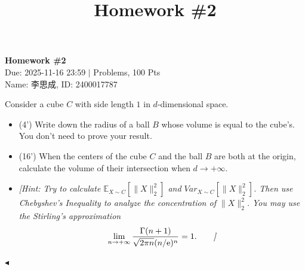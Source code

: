 \documentclass[11pt]{article}
\title{Homework \#2}
\newenvironment{problem}[2][Problem]{\begin{trivlist}
\item[\hskip \labelsep {\bfseries #1}\hskip \labelsep {\bfseries #2.}]}{\hfill$\blacktriangleleft$\end{trivlist}}
\begin{document}
\pagestyle{fancy}
\chead{}

\begin{center}
    {\LARGE \bf Homework \#2}\\
    {Due: 2025-11-16 23:59 \quad$|$ Problems, 100 Pts}\\
    {Name: 李思成, ID: 2400017787}            %
\end{center}



\begin{problem}{1 (20')} Consider a cube $C$ with side length $1$ in $d$-dimensional space.
\begin{itemize}
    \item [(1)] (4') Write down the radius of a ball $B$ whose volume is equal to the cube's. You don't need to prove your result.
    \item [(2)] (16') When the centers of the cube $C$ and the ball $B$ are both at the origin, calculate the volume of their intersection when $d\to+\infty$.
    \item [] \textit{[Hint: Try to calculate $\mathbb{E}_{X\sim C}[\|X\|_2^2]$ and $Var_{X\sim C}[\|X\|_2^2]$. Then use Chebyshev's Inequality to analyze the concentration of $\|X\|_2^2$. You may use the Stirling's approximation}
    \begin{align*}
        \lim_{n\to+\infty}\frac{\Gamma(n+1)}{\sqrt{2\pi n}(n/\mathrm{e})^n}=1.\tag*{\textit{]}}
    \end{align*}
\end{itemize}
\end{problem}
\end{document}
